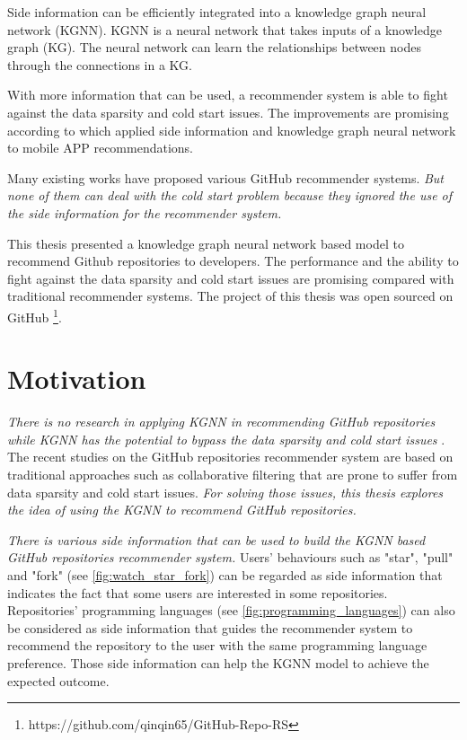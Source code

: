 \documentclass[11pt,twoside]{report}
\begin{document}
Side information can be efficiently integrated into a knowledge graph neural network (KGNN). KGNN is a neural network that takes inputs of a knowledge graph (KG). The neural network can learn the relationships between nodes through the connections in a KG.

With more information that can be used, a recommender system is able to fight against the data sparsity and cold start issues. The improvements are promising according to \cite{zhang_knowledge_2020} which applied side information and knowledge graph neural network to mobile APP recommendations.

Many existing works have proposed various GitHub recommender systems. \textit{But none of them can deal with the cold start problem because they ignored the use of the side information for the recommender system.}

This thesis presented a knowledge graph neural network based model to recommend Github repositories to developers. The performance and the ability to fight against the data sparsity and cold start issues are promising compared with traditional recommender systems. The project of this thesis was open sourced on GitHub \footnote{https://github.com/qinqin65/GitHub-Repo-RS}.

\section{Motivation}
\textit{There is no research in applying KGNN in recommending GitHub repositories while KGNN has the potential to bypass the data sparsity and cold start issues} \cite{mansur_review_nodate}. The recent studies on the GitHub repositories recommender system are based on traditional approaches such as collaborative filtering that are prone to suffer from data sparsity and cold start issues. \textit{For solving those issues, this thesis explores the idea of using the KGNN to recommend GitHub repositories.}

\textit{There is various side information that can be used to build the KGNN based GitHub repositories recommender system.} Users’ behaviours such as "star", "pull" and "fork" (see \ref{fig:watch_star_fork}) can be regarded as side information that indicates the fact that some users are interested in some repositories. Repositories' programming languages (see \ref{fig:programming_languages}) can also be considered as side information that guides the recommender system to recommend the repository to the user with the same programming language preference. Those side information can help the KGNN model to achieve the expected outcome.
\end{document}
